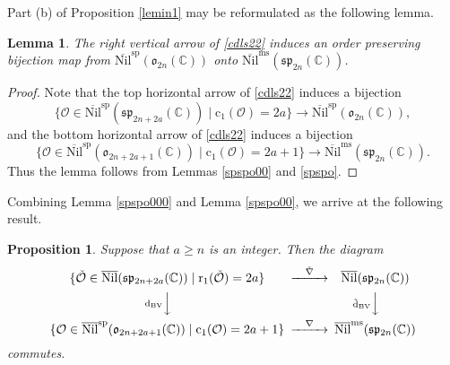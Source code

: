 \documentclass[12pt,a4paper]{amsart}
\newcommand{\BC}{{\mathbb {C}}}
\newcommand{\CO}{{\mathcal {O}}}
\newcommand{\p}{\mathfrak p}
\newcommand{\s}{\mathfrak s}
\renewcommand{\o}{\mathfrak o}
\numberwithin{equation}{section}
\newtheorem{lem}[thm]{Lemma}
\newtheorem{prop}[thm]{Proposition}
\theoremstyle{remark}
\begin{document}
Part (b) of Proposition \ref{lemin1}
may be reformulated as the following lemma.
\begin{lem}\label{lemin11}
The right vertical arrow of \eqref{cdls22} induces an order preserving bijection map from  $\overline{\mathrm{Nil}}^{\mathrm{sp}}(\o_{2n}(\BC))$ onto $\overline{\mathrm{Nil}}^{\mathrm{ms}}(\s\p_{2n}(\BC))$.
\end{lem}
\begin{proof}
Note that the top horizontal arrow of \eqref{cdls22} induces a bijection
 \[
                      \{\CO\in \overline{\mathrm{Nil}}^{\mathrm{sp}}(\s\p_{2n+2a}(\BC))\mid \mathrm{c}_1( \CO)=2a\}\rightarrow
 \overline{\mathrm{Nil}}^{\mathrm{sp}}(\o_{2n}(\BC)),
\]
and the bottom
horizontal arrow of \eqref{cdls22} induces a bijection
 \[
                      \{\CO\in \overline{\mathrm{Nil}}^{\mathrm{sp}}(\o_{2n+2a+1}(\BC))\mid \mathrm{c}_1( \CO)=2a+1\}\rightarrow
\overline{\mathrm{Nil}}^{\mathrm{ms}}(\s\p_{2n}(\BC)).
\]
Thus the lemma follows from Lemmas \ref{spspo00} and \ref{spspo}.
\end{proof}

Combining Lemma \ref{spspo000} and Lemma \ref{spspo00}, we arrive at the following result.

\begin{prop}\label{cdnn}
Suppose that $a\geq n$ is an integer. Then the diagram
\[
 \begin{CD}
            \{\check \CO\in \overline{\mathrm{Nil}}(\s\p_{2n+2a}(\BC))\mid \mathrm{r}_1(\check \CO)=2a\} @>  \check \nabla  >> \overline{\mathrm{Nil}}(\s\p_{2n}(\BC)) \\
            @V \mathrm d_{\mathrm{BV}} VV           @V \tilde{\mathrm d}_{\mathrm{BV}} V V\\
               \{\CO\in \overline{\mathrm{Nil}}^{\mathrm{sp}}(\o_{2n+2a+1}(\BC))\mid \mathrm{c}_1( \CO)=2a+1\}
             @> \nabla   >>  \overline{\mathrm{Nil}}^{\mathrm{ms}}(\s\p_{2n}(\BC))\\
  \end{CD}
\]
commutes.%

\end{prop}

\end{document}
